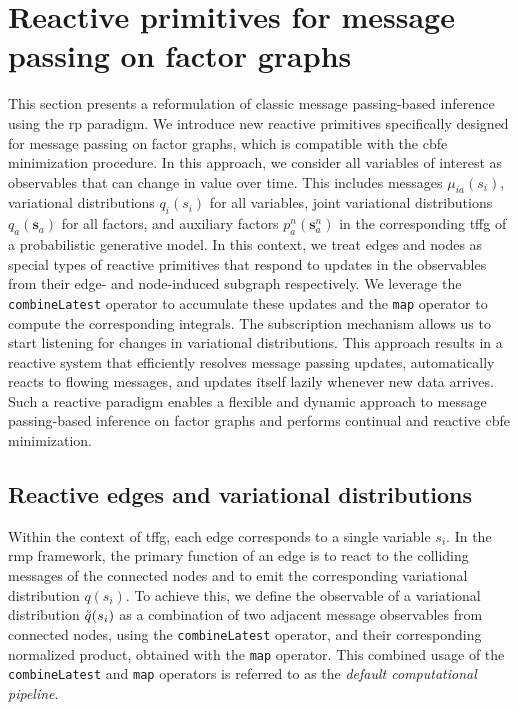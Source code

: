 \section{Reactive primitives for message passing on factor graphs}\label{chapter-03:section:reactive-primitives-on-factor-graphs}

This section presents a reformulation of classic message passing-based inference using the
\ac{rp} paradigm.
We introduce new reactive primitives specifically designed for message passing on factor graphs, which is
compatible with the \ac{cbfe} minimization procedure.
In this approach, we consider all variables of interest as observables that can change in
value over time.
This includes messages $\mu_{ia}(s_i)$, variational distributions $q_i(s_i)$ for all
variables, joint variational distributions $q_a(\bm{s}_a)$ for all factors, and auxiliary
factors $p^n_a(\bm{s}^n_a)$ in the corresponding \ac{tffg} of a probabilistic generative model.
In this context, we treat edges and nodes as special types of reactive primitives that respond
to updates in the observables from their edge- and node-induced subgraph respectively.
We leverage the \texttt{combineLatest} operator to accumulate these updates and the
\texttt{map} operator to compute the corresponding integrals.
The subscription mechanism allows us to start listening for changes in variational
distributions.
This approach results in a reactive system that efficiently resolves message passing updates,
automatically reacts to flowing messages, and updates itself lazily whenever new data arrives.
Such a reactive paradigm enables a flexible and dynamic approach to message passing-based
inference on factor graphs and performs continual and reactive \ac{cbfe} minimization.

\subsection{Reactive edges and variational distributions}

Within the context of \ac{tffg}, each edge corresponds to a single variable $s_i$.
In the \ac{rmp} framework, the primary function of an edge is to react to the
colliding messages of the connected nodes and to emit the corresponding variational
distribution $q(s_i)$.
To achieve this, we define the observable of a variational distribution $\accentset{\circ}{q}(s_i)$ as a
combination of two adjacent message observables from connected nodes, using the
\texttt{combineLatest} operator, and their corresponding normalized product, obtained with the
\texttt{map} operator.
This combined usage of the \texttt{combineLatest} and \texttt{map} operators is referred to as
the \textit{default computational pipeline}.

